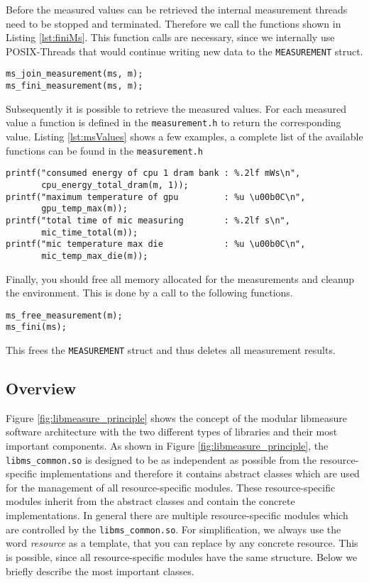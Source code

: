 Before the measured values can be retrieved the internal measurement threads need to be stopped and terminated. Therefore we call the functions shown in Listing \ref{lst:finiMs}. This function calls are necessary, since we internally use POSIX-Threads that would continue writing new data to the \texttt{MEASUREMENT} struct.
\begin{lstlisting}[caption={Functions to join and terminate measurement threads.},label=lst:finiMs]
ms_join_measurement(ms, m);
ms_fini_measurement(ms, m);
\end{lstlisting}

Subsequently it is possible to retrieve the measured values. For each measured value a function is defined in the \texttt{measurement.h} to return the corresponding value. Listing \ref{lst:msValues} shows a few examples, a complete list of the available functions can be found in the \texttt{measurement.h}

\begin{lstlisting}[caption={Example for getting the measured values.},label=lst:msValues]
printf("consumed energy of cpu 1 dram bank : %.2lf mWs\n",
	   cpu_energy_total_dram(m, 1));
printf("maximum temperature of gpu         : %u \u00b0C\n",
	   gpu_temp_max(m));
printf("total time of mic measuring        : %.2lf s\n",
	   mic_time_total(m));
printf("mic temperature max die            : %u \u00b0C\n",
	   mic_temp_max_die(m));
\end{lstlisting}

Finally, you should free all memory allocated for the measurements and cleanup the environment. This is done by a call to the following functions.
\begin{lstlisting}[caption={Environment cleanup and freeing memory.},label=lst:cleanupMS]
ms_free_measurement(m);
ms_fini(ms);
\end{lstlisting}
This frees the \texttt{MEASUREMENT} struct and thus deletes all measurement results.


\subsection{Overview}
Figure \ref{fig:libmeasure_principle} shows the concept of the modular libmeasure software architecture with the two different types of libraries and their most important components. As shown in Figure \ref{fig:libmeasure_principle}, the \texttt{libms\_common.so} is designed to be as independent as possible from the resource-specific implementations and therefore it contains abstract classes which are used for the management of all resource-specific modules. These resource-specific modules inherit from the abstract classes and contain the concrete implementations. In general there are multiple resource-specific modules which are controlled by the \texttt{libms\_common.so}. For simplification, we always use the word \textit{resource} as a template, that you can replace by any concrete resource. This is possible, since all resource-specific modules have the same structure. Below we briefly describe the most important classes.


